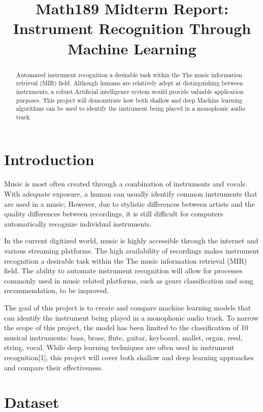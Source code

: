 \documentclass{article}
\title{Math189 Midterm Report: Instrument Recognition Through Machine Learning}
\begin{document}
\maketitle

\begin{abstract}
  Automated instrument recognition a desirable task within the The music information retrieval (MIR) field. Although humans are relatively adept at distinguishing between instruments, a robust Artificial intelligence system would provide valuable application purposes. This project will demonstrate how both shallow and deep Machine learning algorithms can be used to identify the instrument being played in a monophonic audio track.
\end{abstract}

\section{Introduction}

Music is most often created through a combination of instruments and vocals. With adequate exposure, a human can usually identify common instruments that are used in a music; However, due to stylistic differences between artists and the quality differences between recordings, it is still difficult for computers automatically recognize individual instruments.

In the current digitized world, music is highly accessible through the internet and various streaming platforms. The high availability of recordings makes instrument recognition a desirable task within the The music information retrieval (MIR) field. The ability to automate instrument recognition will allow for processes commonly used in music related platforms, such as genre classification and song recommendation, to be improved.

The goal of this project is to create and compare machine learning models that can identify the instrument being played in a monophonic audio track. To narrow the scope of this project, the model has been limited to the classification of 10 musical instruments: bass, brass, flute, guitar, keyboard, mallet, organ, reed, string, vocal. While deep learning techniques are often used in instrument recognition[1], this project will cover both shallow and deep learning approaches and compare their effectiveness.

\section{Dataset}
\label{Dataset}
\end{document}
